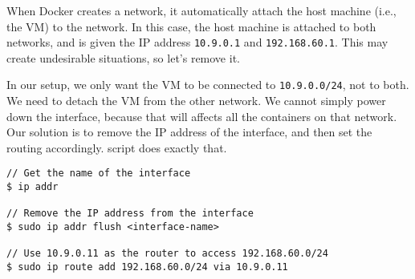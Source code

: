 
When Docker creates a network, it automatically attach the
host machine (i.e., the VM) to the network. In this
case, the host machine is attached to both
networks, and is given the IP address \texttt{10.9.0.1} and
\texttt{192.168.60.1}.
This may create undesirable situations,
so let's remove it.

In our setup, we only want the VM to be connected to
\texttt{10.9.0.0/24}, not to both.
We need to detach the VM from the other network. We cannot simply power down
the interface, because that will affects all the containers on that network.
Our solution is to remove the IP address
of the interface, and then set the routing accordingly. 
script does exactly that.


\begin{lstlisting}
// Get the name of the interface 
$ ip addr

// Remove the IP address from the interface
$ sudo ip addr flush <interface-name>

// Use 10.9.0.11 as the router to access 192.168.60.0/24
$ sudo ip route add 192.168.60.0/24 via 10.9.0.11
\end{lstlisting}

